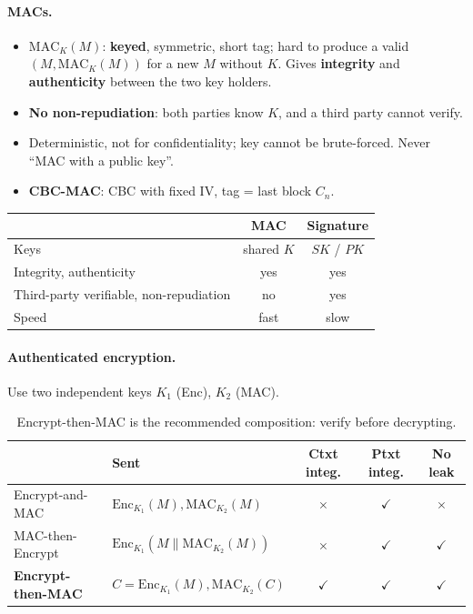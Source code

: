 \paragraph{MACs.}
\begin{itemize}
    \item $\mathrm{MAC}_K(M)$: \textbf{keyed}, symmetric, short tag; hard to produce a valid $(M, \mathrm{MAC}_K(M))$ for a new $M$ without $K$. Gives \textbf{integrity} and \textbf{authenticity} between the two key holders.
    \item \textbf{No non-repudiation}: both parties know $K$, and a third party cannot verify.
    \item Deterministic, not for confidentiality; key cannot be brute-forced. Never ``MAC with a public key''.
    \item \textbf{CBC-MAC}: CBC with fixed IV, tag = last block $C_n$.
\end{itemize}

\begin{table}[h]
\centering
\begin{tabular}{@{}lcc@{}}
\toprule
 & \textbf{MAC} & \textbf{Signature} \\
\midrule
Keys & shared $K$ & $SK$ / $PK$ \\
Integrity, authenticity & yes & yes \\
Third-party verifiable, non-repudiation & no & yes \\
Speed & fast & slow \\
\bottomrule
\end{tabular}
\end{table}

\paragraph{Authenticated encryption.} Use two independent keys $K_1$ (Enc), $K_2$ (MAC).

\begin{table}[h]
\centering
\begin{tabular}{@{}llccc@{}}
\toprule
 & \textbf{Sent} & \textbf{Ctxt integ.} & \textbf{Ptxt integ.} & \textbf{No leak} \\
\midrule
Encrypt-and-MAC & $\mathrm{Enc}_{K_1}(M), \mathrm{MAC}_{K_2}(M)$ & $\times$ & $\checkmark$ & $\times$ \\
MAC-then-Encrypt & $\mathrm{Enc}_{K_1}(M \| \mathrm{MAC}_{K_2}(M))$ & $\times$ & $\checkmark$ & $\checkmark$ \\
\textbf{Encrypt-then-MAC} & $C = \mathrm{Enc}_{K_1}(M), \mathrm{MAC}_{K_2}(C)$ & $\checkmark$ & $\checkmark$ & $\checkmark$ \\
\bottomrule
\end{tabular}
\caption{Encrypt-then-MAC is the recommended composition: verify before decrypting.}
\end{table}

